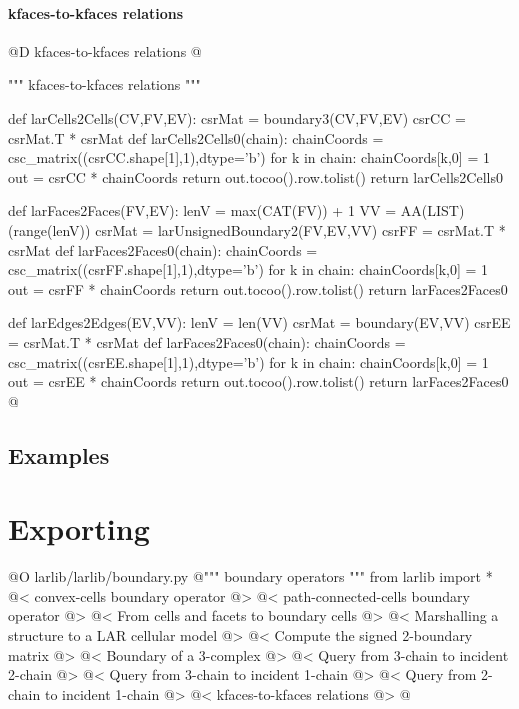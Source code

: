 \documentclass[11pt,oneside]{article}	%
\begin{document}
\paragraph{kfaces-to-kfaces relations}
@D kfaces-to-kfaces relations
@{""" kfaces-to-kfaces relations """

def larCells2Cells(CV,FV,EV):
    csrMat = boundary3(CV,FV,EV)
    csrCC = csrMat.T * csrMat
    def larCells2Cells0(chain):
        chainCoords = csc_matrix((csrCC.shape[1],1),dtype='b')
        for k in chain: chainCoords[k,0] = 1
        out = csrCC * chainCoords
        return out.tocoo().row.tolist()
    return larCells2Cells0

def larFaces2Faces(FV,EV):
    lenV = max(CAT(FV)) + 1
    VV = AA(LIST)(range(lenV))
    csrMat = larUnsignedBoundary2(FV,EV,VV)
    csrFF = csrMat.T * csrMat
    def larFaces2Faces0(chain):
        chainCoords = csc_matrix((csrFF.shape[1],1),dtype='b')
        for k in chain: chainCoords[k,0] = 1
        out = csrFF * chainCoords
        return out.tocoo().row.tolist()
    return larFaces2Faces0

def larEdges2Edges(EV,VV):
    lenV = len(VV)
    csrMat = boundary(EV,VV)
    csrEE = csrMat.T * csrMat
    def larFaces2Faces0(chain):
        chainCoords = csc_matrix((csrEE.shape[1],1),dtype='b')
        for k in chain: chainCoords[k,0] = 1
        out = csrEE * chainCoords
        return out.tocoo().row.tolist()
    return larFaces2Faces0
@}


\subsection{Examples}



\section{Exporting}
@O larlib/larlib/boundary.py
@{""" boundary operators """
from larlib import *
@< convex-cells boundary operator @>
@< path-connected-cells boundary operator @>
@< From cells and facets to boundary cells @>
@< Marshalling a structure to a LAR cellular model @>
@< Compute the signed 2-boundary matrix @>
@< Boundary of a 3-complex @>
@< Query from 3-chain to incident 2-chain @>
@< Query from 3-chain to incident 1-chain @>
@< Query from 2-chain to incident 1-chain @>
@< kfaces-to-kfaces relations @>
@}
\end{document}
